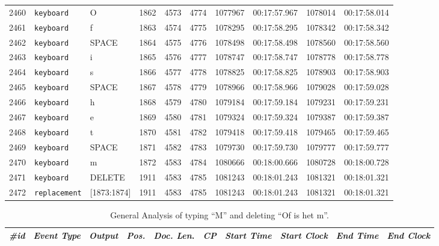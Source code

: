 \begin{paper}
\begin{table}[H]
\begin{tabular}{p{}p{}|p{}|p{}p{}p{}p{}p{}p{}p{}}
2460 & \verb|keyboard| & O & 1862 & 4573 & 4774 & 1077967 & 00:17:57.967 & 1078014 & 00:17:58.014\tabularnewline
2461 & \verb|keyboard| & f & 1863 & 4574 & 4775 & 1078295 & 00:17:58.295 & 1078342 & 00:17:58.342\tabularnewline
2462 & \verb|keyboard| & SPACE & 1864 & 4575 & 4776 & 1078498 & 00:17:58.498 & 1078560 & 00:17:58.560\tabularnewline
2463 & \verb|keyboard| & i & 1865 & 4576 & 4777 & 1078747 & 00:17:58.747 & 1078778 & 00:17:58.778\tabularnewline
2464 & \verb|keyboard| & s & 1866 & 4577 & 4778 & 1078825 & 00:17:58.825 & 1078903 & 00:17:58.903\tabularnewline
2465 & \verb|keyboard| & SPACE & 1867 & 4578 & 4779 & 1078966 & 00:17:58.966 & 1079028 & 00:17:59.028\tabularnewline
2466 & \verb|keyboard| & h & 1868 & 4579 & 4780 & 1079184 & 00:17:59.184 & 1079231 & 00:17:59.231\tabularnewline
2467 & \verb|keyboard| & e & 1869 & 4580 & 4781 & 1079324 & 00:17:59.324 & 1079387 & 00:17:59.387\tabularnewline
2468 & \verb|keyboard| & t & 1870 & 4581 & 4782 & 1079418 & 00:17:59.418 & 1079465 & 00:17:59.465\tabularnewline
2469 & \verb|keyboard| & SPACE & 1871 & 4582 & 4783 & 1079730 & 00:17:59.730 & 1079777 & 00:17:59.777\tabularnewline
2470 & \verb|keyboard| & m & 1872 & 4583 & 4784 & 1080666 & 00:18:00.666 & 1080728 & 00:18:00.728\tabularnewline
2471 & \verb|keyboard| & DELETE & 1911 & 4583 & 4785 & 1081243 & 00:18:01.243 & 1081321 & 00:18:01.321\tabularnewline
2472 & \verb|replacement| & [1873:1874] & 1911 & 4583 & 4785 & 1081243 & 00:18:01.243 & 1081321 & 00:18:01.321\tabularnewline
\bottomrule
\end{tabular}
\end{table}

\begin{table}[H]
\centering\tiny\renewcommand{\arraystretch}{1.5}
\caption[General Analysis of typing ``M'' and deleting ``Of is het m''.]{General Analysis of typing ``M'' and deleting ``Of is het m''.\footnotemark[3]}
\label{tab:bekius:replacement3}
\begin{tabular}{p{}p{}|p{}|p{}p{}p{}p{}p{}p{}p{}}
\toprule
\textit{\#id} & \textit{Event Type} & \textit{Output} & \textit{Pos.} & \textit{Doc. Len}. & \textit{CP} & \textit{Start Time} & \textit{Start Clock} & \textit{End Time }& \textit{End Clock}\tabularnewline
\midrule


\end{tabular}
\end{table}
\end{paper}
